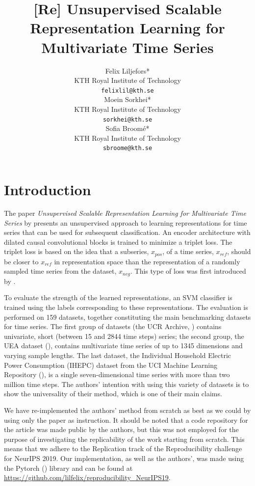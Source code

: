 \documentclass{article}
\title{[Re] Unsupervised Scalable Representation Learning for Multivariate Time Series}
\author{%
  Felix Liljefors* \\
  KTH Royal Institute of Technology \\
  \texttt{felixlil@kth.se} \\
  \And
  Moein Sorkhei* \\
  KTH Royal Institute of Technology \\
  \texttt{sorkhei@kth.se} \\
  \AND
  Sofia Broomé* \\
  KTH Royal Institute of Technology \\
  \texttt{sbroome@kth.se}
}
\begin{document}
\maketitle


\section{Introduction}

The paper \textit{Unsupervised Scalable Representation Learning for Multivariate Time Series} by \cite{FranceschiUnsupervised2019} presents an unsupervised approach to learning representations for time series that can be used for subsequent classification. An encoder architecture with dilated causal convolutional blocks is trained to minimize a triplet loss. The triplet loss is based on the idea that a subseries, $x_{pos}$, of a time series, $x_{ref}$, should be closer to $x_{ref}$ in representation space than the representation of a randomly sampled time series from the dataset, $x_{neg}$. This type of loss was first introduced by \cite{ogtriplet}.

To evaluate the strength of the learned representations, an SVM classifier is trained using the labels corresponding to these representations. The evaluation is performed on 159 datasets, together constituting the main benchmarking datasets for time series. The first group of datasets (the UCR Archive, \cite{UCRArchive2018}) contains univariate, short (between 15 and 2844 time steps) series; the second group, the UEA dataset (\cite{bagnall2018uea}), contains multivariate time series of up to 1345 dimensions and varying sample lengths. The last dataset, the Individual Household Electric Power Consumption (IHEPC) dataset from the UCI Machine Learning Repository (\cite{Dua:2019}), is a single seven-dimensional time series with more than two million time steps. The authors' intention with using this variety of datasets is to show the universality of their method, which is one of their main claims.

We have re-implemented the authors' method from scratch as best as we could by using only the paper as instruction. It should be noted that a code repository for the article was made public by the authors, but this was not employed for the purpose of investigating the replicability of the work starting from scratch. This means that we adhere to the Replication track of the Reproducibility challenge for NeurIPS 2019. Our implementation, as well as the authors', was made using the Pytorch (\cite{Pytorchpaszke2017automatic}) library and can be found at \url{https://github.com/lilfelix/reproducibility_NeurIPS19}.
\end{document}
